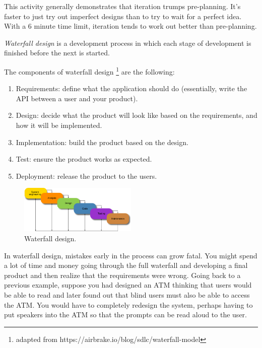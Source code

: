 This activity generally demonstrates that iteration trumps pre-planning. It's faster to just try out imperfect designs than to try to wait for a perfect idea. With a 6 minute time limit, iteration tends to work out better than pre-planning. 

\begin{definition}
\emph{Waterfall design} is a development process in which each stage of development is finished before the next is started. 
\end{definition}

The components of waterfall design \footnote{adapted from https://airbrake.io/blog/sdlc/waterfall-model} are the following:
\begin{enumerate}
	\item Requirements: define what the application should do (essentially, write the API between a user and your product).
	\item Design: decide what the product will look like based on the requirements, and how it will be implemented.
	\item Implementation: build the product based on the design.
	\item Test: ensure the product works as expected.
	\item Deployment: release the product to the users.
\end{enumerate}

\begin{figure}
	\centering
	\includegraphics[width=0.5\textwidth]{images/waterfall.png}
	\caption{Waterfall design.}
\end{figure}

In waterfall design, mistakes early in the process can grow fatal. You might spend a lot of time and money going through the full waterfall and developing a final product and then realize that the requirements were wrong. Going back to a previous example, suppose you had designed an ATM thinking that users would be able to read and later found out that blind users must also be able to access the ATM. You would have to completely redesign the system, perhaps having to put speakers into the ATM so that the prompts can be read aloud to the user. 

